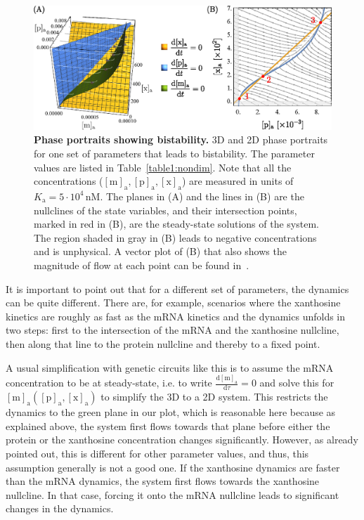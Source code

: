 \documentclass[10pt,letterpaper]{article}
\newcommand{\unit}[1]{\,\mathrm{#1}}
\newcommand{\n}[1]{\mathrm{#1}}
\newcommand{\dd}[2]{\frac{\mathrm{d} #1}{\mathrm{d} #2}}
\begin{document}
\begin{figure}%
	\centering
	\includegraphics[width=1\textwidth]{media/Bistability.eps}
	\caption{{\bf Phase portraits showing bistability.}
		3D and 2D phase portraits for one set of parameters that leads to
		bistability. The parameter values are listed in
		Table~\ref{table1:nondim}. Note that all the concentrations
		($\n{[m]_a}, \n{[p]_a}, \n{[x]_a}$) are measured in units of
		$K_{\n{a}} = 5 \cdot 10^{4} \unit{nM}$. The planes in (A) and the
		lines in (B) are the nullclines of the state variables, and their
		intersection points, marked in red in (B), are the steady-state
		solutions of the system. The region shaded in gray in (B) leads to
		negative concentrations and is unphysical. A vector plot of (B) that
		also shows the magnitude of flow at each point can be found
		in~.}
	\label{fig4:bistability}
\end{figure}

It is important to point out that for a different set of parameters, the
dynamics can be quite different. There are, for example, scenarios where the
xanthosine kinetics are roughly as fast as the mRNA kinetics and the
dynamics unfolds in two steps: first to the intersection of the mRNA and the
xanthosine nullcline, then along that line to the protein nullcline and
thereby to a fixed point.

A usual simplification with genetic circuits like this is to assume the mRNA
concentration to be at steady-state, i.e. to write $\dd{\n{[m]_a}}{\tau}=0$
and solve this for $\n{[m]_a}(\n{[p]_a},\n{[x]_a})$ to simplify the 3D to a
2D system. This restricts the dynamics to the green plane in our plot, which
is reasonable here because as explained above, the system first flows
towards that plane before either the protein or the xanthosine concentration
changes significantly. However, as already pointed out, this is different
for other parameter values, and thus, this assumption generally is not a
good one. If the xanthosine dynamics are faster than the mRNA dynamics, the
system first flows towards the xanthosine nullcline. In that case, forcing
it onto the mRNA nullcline leads to significant changes in the dynamics.
\end{document}
